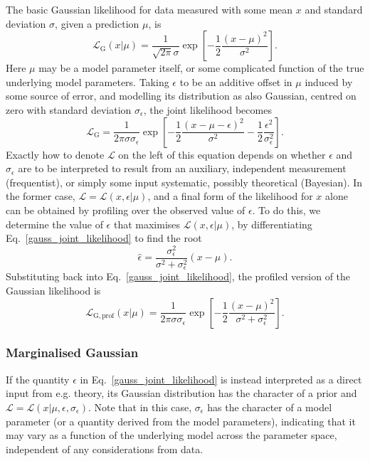 \documentclass[pdftex,twocolumn,epjc3_preprint,runningheads]{svjour3}
\renewcommand{\_}{\discretionary{\underscore}{}{\underscore}}
\begin{document}
The basic Gaussian likelihood for data measured with some mean $x$ and standard deviation $\sigma$, given a prediction $\mu$, is
\begin{equation}
\mathcal{L}_\mathrm{G}(x|\mu) = \frac{1}{\sqrt{2\pi}\sigma} \exp\left[-\frac12\frac{(x-\mu)^2}{\sigma^2}\right].
\end{equation}
Here $\mu$ may be a model parameter itself, or some complicated function of the true underlying model parameters.  Taking $\epsilon$ to be an additive offset in $\mu$ induced by some source of error, and modelling its distribution as also Gaussian, centred on zero with standard deviation $\sigma_\epsilon$, the joint likelihood becomes
\begin{equation}
\label{gauss_joint_likelihood}
\mathcal{L}_\mathrm{G} = \frac{1}{2\pi\sigma\sigma_\epsilon} \exp\left[-\frac12\frac{(x-\mu-\epsilon)^2}{\sigma^2} - \frac12\frac{\epsilon^2}{\sigma_\epsilon^2}\right].
\end{equation}
Exactly how to denote $\mathcal{L}$ on the left of this equation depends on whether $\epsilon$ and $\sigma_\epsilon$ are to be interpreted to result from an auxiliary, independent measurement (frequentist), or simply some input systematic, possibly theoretical (Bayesian).  In the former case, $\mathcal{L} = \mathcal{L}(x,\epsilon|\mu)$, and a final form of the likelihood for $x$ alone can be obtained by profiling over the observed value of $\epsilon$.  To do this, we determine the value of $\epsilon$ that maximises $\mathcal{L}(x,\epsilon|\mu)$, by differentiating Eq.\ \ref{gauss_joint_likelihood} to find the root
\begin{equation}
\hat\epsilon = \frac{\sigma_\epsilon^2}{\sigma^2 + \sigma_\epsilon^2}(x-\mu).
\end{equation}
Substituting back into Eq.\ \ref{gauss_joint_likelihood}, the profiled version of the Gaussian likelihood is
\begin{equation}
\label{gauss_prof}
\mathcal{L}_\mathrm{G,prof}(x|\mu) = \frac{1}{2\pi\sigma\sigma_\epsilon} \exp\left[-\frac12\frac{(x-\mu)^2}{\sigma^2 + \sigma_\epsilon^2}\right].
\end{equation}

\subsubsection{Marginalised Gaussian}

If the quantity $\epsilon$ in Eq.\ \ref{gauss_joint_likelihood} is instead interpreted as a direct input from e.g. theory, its Gaussian distribution has the character of a prior and $\mathcal{L} = \mathcal{L}(x|\mu,\epsilon,\sigma_\epsilon)$.  Note that in this case, $\sigma_\epsilon$ has the character of a model parameter (or a quantity derived from the model parameters), indicating that it may vary as a function of the underlying model across the parameter space, independent of any considerations from data.
\end{document}
